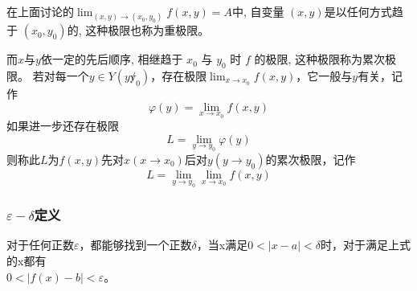在上面讨论的$\lim_{(x,y)\to(x_0,y_0)}f(x,y)=A$中, 自变量 $(x, y)$是以任何方式趋于 $(x_0, y_0)$的, 这种极限也称为重极限。

而$x$与$y$依一定的先后顺序, 相继趋于 $x_0$ 与 $y_0$ 时 $f$ 的极限, 这种极限称为累次极限。
若对每一个$y\in Y(y\not y_0)$，存在极限$\lim_{x\to x_0}f(x,y)$，它一般与$y$有关，记作
$$\varphi(y)=\lim_{x\to x_0}f(x,y)$$
如果进一步还存在极限
$$L=\lim_{y\to y_0}\varphi(y)$$
则称此$L$为$f(x,y)$先对$x(x\to x_0)$后对$y(y\to y_0)$的累次极限，记作
$$L=\lim_{y\to y_0}\lim_{x\to x_0}f(x,y)$$


\subsubsection{$\varepsilon-\delta$定义}

对于任何正数$\varepsilon$，都能够找到一个正数$\delta$，当x满足${0<\mid x-a\mid <\delta }$时，对于满足上式的x都有\\ ${0<\mid f(x)-b\mid <\varepsilon }$。